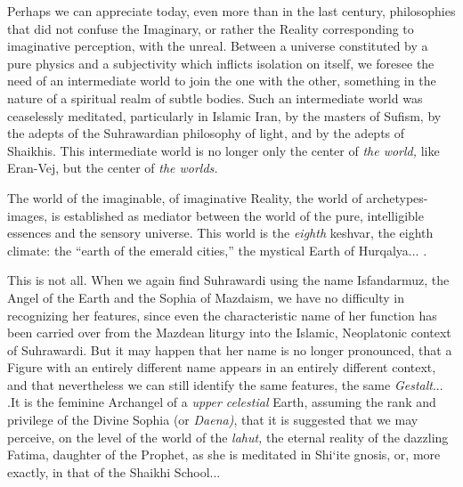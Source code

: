 \begin{quotationx}
Perhaps we can appreciate today, even more than in the last century, philosophies that did not confuse the Imaginary, or rather the Reality corresponding to imaginative perception, with the unreal. Between a universe constituted by a pure physics and a subjectivity which inflicts isolation on itself, we foresee the need of an intermediate world to join the one with the other, something in the nature of a spiritual realm of subtle bodies. Such an intermediate world was ceaselessly meditated, particularly in Islamic Iran, by the masters of Sufism, by the adepts of the Suhrawardian philosophy of light, and by the adepts of Shaikhis. This intermediate world is no longer only the center of \emph{the world,} like Eran-Vej, but the center of \emph{the worlds.}

The world of the imaginable, of imaginative Reality, the world of archetypes-images, is established as mediator between the world of the pure, intelligible essences and the sensory universe. This world is the \emph{eighth} keshvar, the eighth climate: the ``earth of the emerald cities,'' the mystical Earth of Hurqalya... .

This is not all. When we again find Suhrawardi using the name Isfandarmuz, the Angel of the Earth and the Sophia of Mazdaism, we have no difficulty in recognizing her features, since even the characteristic name of her function has been carried over from the Mazdean liturgy into the Islamic, Neoplatonic context of Suhrawardi. But it may happen that her name is no longer pronounced, that a Figure with an entirely different name appears in an entirely different context, and that nevertheless we can still identify the same features, the same \emph{Gestalt}... .It is the feminine Archangel of a \emph{upper celestial} Earth, assuming the rank and privilege of the Divine Sophia (or \emph{Daena)}, that it is suggested that we may perceive, on the level of the world of the \emph{lahut,} the eternal reality of the dazzling Fatima, daughter of the Prophet, as she is meditated in Shi`ite gnosis, or, more exactly, in that of the Shaikhi School...


\end{quotationx}
